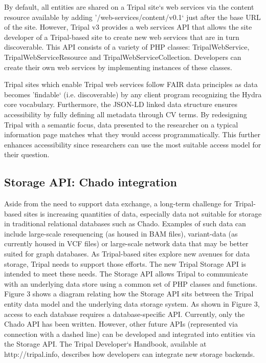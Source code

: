 By default, all entities are shared on a Tripal site`s web services via the content resource available by adding '/web-services/content/v0.1` just after the base URL of the site. However, Tripal v3 provides a web services API that allows the site developer of a Tripal-based site to create new web services that are in turn discoverable. This API consists of a variety of PHP classes: TripalWebService, TripalWebServiceResource and TripalWebServiceCollection. Developers can create their own web services by implementing instances of these classes.

Tripal sites which enable Tripal web services follow FAIR data principles as data becomes 'findable` (i.e. discoverable) by any client program recognizing the Hydra core vocabulary. Furthermore, the JSON-LD linked data structure ensures accessibility by fully defining all metadata through CV terms. By redesigning Tripal with a semantic focus, data presented to the researcher on a typical information page matches what they would access programmatically. This further enhances accessibility since researchers can use the most suitable access model for their question.

\subsection*{Storage API: Chado integration}

Aside from the need to support data exchange, a long-term challenge for Tripal-based sites is increasing quantities of data, especially data not suitable for storage in traditional relational databases such as Chado. Examples of such data can include large-scale resequencing (as housed in BAM files), variant-data (as currently housed in VCF files) or large-scale network data that may be better suited for graph databases. As Tripal-based sites explore new avenues for data storage, Tripal needs to support those efforts. The new Tripal Storage API is intended to meet these needs. The Storage API allows Tripal to communicate with an underlying data store using a common set of PHP classes and functions. Figure 3 shows a diagram relating how the Storage API sits between the Tripal entity data model and the underlying data storage system. As shown in Figure 3, access to each database requires a database-specific API. Currently, only the Chado API has been written. However, other future APIs (represented via connection with a dashed line) can be developed and integrated into entities via the Storage API. The Tripal Developer`s Handbook, available at http://tripal.info, describes how developers can integrate new storage backends.

